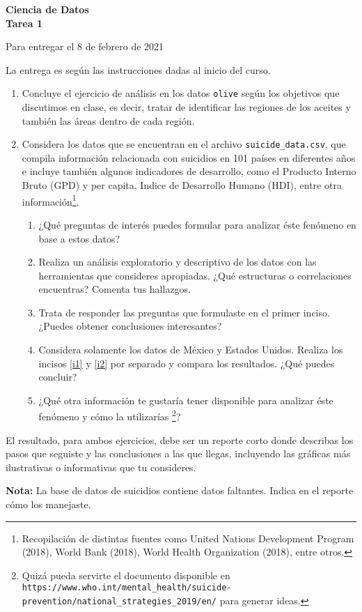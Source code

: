 \documentclass[letterpaper,12pt]{report}
\begin{document}
\begin{center}
  {\Large \bf Ciencia de Datos \\
    Tarea 1}
\end{center} 
\vspace{0.3cm}
\begin{center}
  \large Para entregar el 8 de febrero de 2021

  \small La entrega es según las instrucciones dadas al inicio del curso.
\end{center}

\bigskip

\begin{enumerate}
\item Concluye el ejercicio de análisis en los datos \verb|olive| según los objetivos que discutimos en clase, es decir, tratar de identificar las regiones de los aceites y también las áreas dentro de cada región. 
\item Considera los datos que se encuentran en el archivo \verb|suicide_data.csv|, que compila información relacionada con suicidios en 101 países en diferentes años e incluye también algunos indicadores de desarrollo, como el Producto Interno Bruto (GPD) y per capita, Indice de Desarrollo Humano (HDI), entre otra información\footnote{Recopilación de distintas fuentes como United Nations Development Program (2018), World Bank (2018), World Health Organization (2018), entre otros.}.
  \begin{enumerate}
  \item ¿Qué preguntas de interés puedes formular para analizar éste fenómeno en base a estos datos?
  \item \label{i1} Realiza un análisis exploratorio y descriptivo de los datos con las herramientas que consideres apropiadas. ¿Qué estructuras o correlaciones encuentras? Comenta tus hallazgos. 
  \item \label{i2}Trata de responder las preguntas que formulaste en el primer inciso. ¿Puedes obtener conclusiones interesantes?
  \item Considera solamente los datos de México y Estados Unidos. Realiza los incisos \ref{i1} y \ref{i2} por separado y compara los resultados. ¿Qué puedes concluir?
  \item ¿Qué otra información te gustaría tener disponible para analizar éste fenómeno y cómo la utilizarías \cprotect\footnote{Quizá pueda servirte el documento disponible en\\
      \verb|https://www.who.int/mental_health/suicide-prevention/national_strategies_2019/en/| para generar ideas.}?
  \end{enumerate}
\end{enumerate}
  El resultado, para ambos ejercicios, debe ser un reporte corto donde describas los pasos que seguiste y las conclusiones a las que llegas, incluyendo las gráficas más ilustrativas o informativas que tu consideres.

  \textbf{Nota:} La base de datos de suicidios contiene datos faltantes. Indica en el reporte cómo los manejaste.
\end{document}
